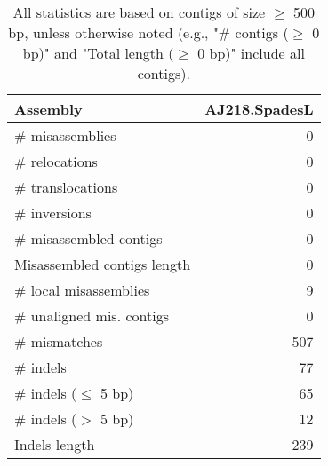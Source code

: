 \documentclass[12pt,a4paper]{article}
\begin{document}
\begin{table}[ht]
\begin{center}
\caption{All statistics are based on contigs of size $\geq$ 500 bp, unless otherwise noted (e.g., "\# contigs ($\geq$ 0 bp)" and "Total length ($\geq$ 0 bp)" include all contigs).}
\begin{tabular}{|l*{1}{|r}|}
\hline
Assembly & AJ218.SpadesL \\ \hline
\# misassemblies & 0 \\ \hline
\hspace{5mm}\# relocations & 0 \\ \hline
\hspace{5mm}\# translocations & 0 \\ \hline
\hspace{5mm}\# inversions & 0 \\ \hline
\# misassembled contigs & 0 \\ \hline
Misassembled contigs length & 0 \\ \hline
\# local misassemblies & 9 \\ \hline
\# unaligned mis. contigs & 0 \\ \hline
\# mismatches & 507 \\ \hline
\# indels & 77 \\ \hline
\hspace{5mm}\# indels ($\leq$ 5 bp) & 65 \\ \hline
\hspace{5mm}\# indels ($>$ 5 bp) & 12 \\ \hline
Indels length & 239 \\ \hline
\end{tabular}
\end{center}
\end{table}
\end{document}
